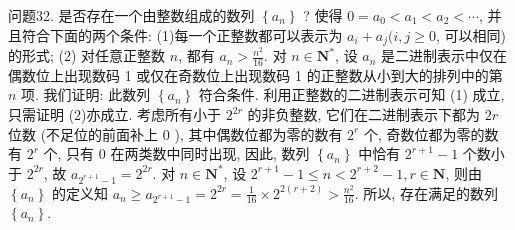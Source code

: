 问题32. 是否存在一个由整数组成的数列 $\left\{a_n\right\}$ ? 使得 $0=a_0<a_1<a_2<\cdots$, 并且符合下面的两个条件:
(1)每一个正整数都可以表示为 $a_i+a_j(i, j \geqslant 0$, 可以相同) 的形式;
(2) 对任意正整数 $n$, 都有 $a_n>\frac{n^2}{16}$.
对 $n \in \mathbf{N}^*$, 设 $a_n$ 是二进制表示中仅在偶数位上出现数码 1 或仅在奇数位上出现数码 1 的正整数从小到大的排列中的第 $n$ 项.
我们证明: 此数列 $\left\{a_n\right\}$ 符合条件.
利用正整数的二进制表示可知 (1) 成立, 只需证明 (2)亦成立.
考虑所有小于 $2^{2 r}$ 的非负整数, 它们在二进制表示下都为 $2 r$ 位数 (不足位的前面补上 0 ), 其中偶数位都为零的数有 $2^r$ 个, 奇数位都为零的数有 $2^r$ 个, 只有 0 在两类数中同时出现, 因此, 数列 $\left\{a_n\right\}$ 中恰有 $2^{r+1}-1$ 个数小于 $2^{2 r}$, 故 $a_{2^{r+1}-1}=2^{2 r}$.
对 $n \in \mathbf{N}^*$, 设 $2^{r+1}-1 \leqslant n<2^{r+2}-1, r \in \mathbf{N}$, 则由 $\left\{a_n\right\}$ 的定义知 $a_n \geqslant a_{2^{r+1}-1}=2^{2 r}=\frac{1}{16} \times 2^{2(r+2)}>\frac{n^2}{16}$.
所以, 存在满足的数列 $\left\{a_n\right\}$.


